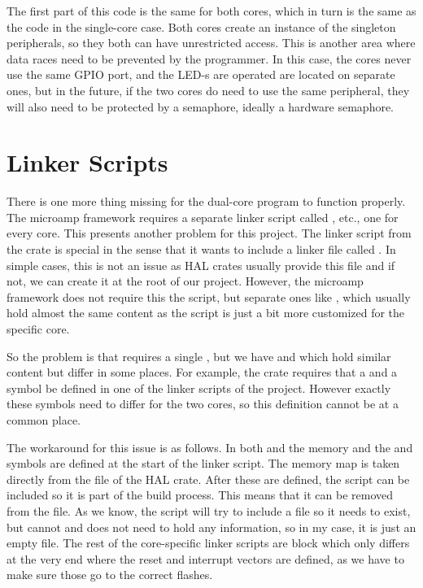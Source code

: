 The first part of this code is the same for both cores, which in turn is the same as the code in the single-core case. Both cores create an instance of the singleton peripherals, so they both can have unrestricted access. This is another area where data races need to be prevented by the programmer. In this case, the cores never use the same GPIO port, and the LED-s are operated are located on separate ones, but in the future, if the two cores do need to use the same peripheral, they will also need to be protected by a semaphore, ideally a hardware semaphore.

\section{Linker Scripts}

There is one more thing missing for the dual-core program to function properly. The microamp framework requires a separate linker script called ,  etc., one for every core. This presents another problem for this project. The  linker script from the  crate is special in the sense that it wants to include a linker file called . In simple cases, this is not an issue as HAL crates usually provide this file and if not, we can create it at the root of our project. However, the microamp framework does not require this the  script, but separate ones like , which usually hold almost the same content as the  script is just a bit more customized for the specific core.

So the problem is that  requires a single , but we have  and  which hold similar content but differ in some places. For example, the  crate requires that a  and a  symbol be defined in one of the linker scripts of the project. However exactly these symbols need to differ for the two cores, so this definition cannot be at a common place.

The workaround for this issue is as follows. In both  and  the memory and the  and  symbols are defined at the start of the linker script. The memory map is taken directly from the  file of the HAL crate. After these are defined, the  script can be included so it is part of the build process. This means that it can be removed from the  file. As we know, the  script will try to include a  file so it needs to exist, but cannot and does not need to hold any information, so in my case, it is just an empty file. The rest of the core-specific linker scripts are  block which only differs at the very end where the reset and interrupt vectors are defined, as we have to make sure those go to the correct flashes.

